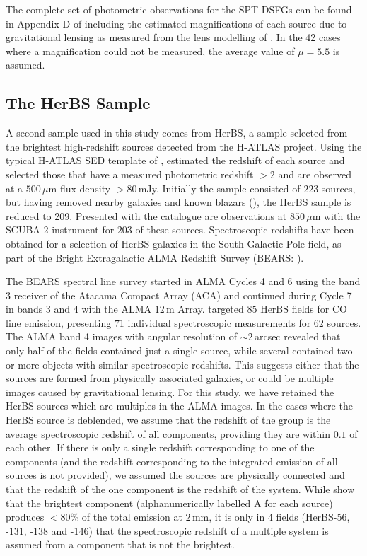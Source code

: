 The complete set of photometric observations for the SPT DSFGs can be found in Appendix D of \citealt{Reuter_2020} including the estimated magnifications of each source due to gravitational lensing as measured from the lens modelling of \citealt{Spilker_2016}. In the 42 cases where a magnification could not be measured, the average value of $\mu = 5.5$ is assumed.

\subsection{The HerBS Sample}

A second sample used in this study comes from HerBS, a sample selected from the brightest high-redshift sources detected from the H-ATLAS project. Using the typical H-ATLAS SED template of \citealt{Pearson_2013}, \citealt{Bakx_2018} estimated the redshift of each source and selected those that have a measured photometric redshift $> 2$ and are observed at a $500\,\mu$m flux density $> 80\,$mJy. Initially the sample consisted of $223$ sources, but having removed nearby galaxies and known blazars (\citealt{Negrello_2010, Lopez-Caniego_2013}), the HerBS sample is reduced to 209. Presented with the catalogue are observations at $850\,\mu$m with the SCUBA-2 instrument for $203$ of these sources. Spectroscopic redshifts have been obtained for a selection of HerBS galaxies in the South Galactic Pole field, as part of the Bright Extragalactic ALMA Redshift Survey (BEARS: \citealt{Urquhart_2022, Bendo_2023, Hagimoto_2023}).

The BEARS spectral line survey started in ALMA Cycles 4 and 6 using the band 3 receiver of the Atacama Compact Array (ACA) and continued during Cycle 7 in bands 3 and 4 with the ALMA $12\,$m Array. \citealt{Urquhart_2022} targeted $85$ HerBS fields for CO line emission, presenting $71$ individual spectroscopic measurements for $62$ sources. The ALMA band 4 images with angular resolution of $\sim 2\,$arcsec revealed that only half of the fields contained just a single source, while several contained two or more objects with similar spectroscopic redshifts. This suggests either that the sources are formed from physically associated galaxies, or could be multiple images caused by gravitational lensing. For this study, we have retained the HerBS sources which are multiples in the ALMA images. In the cases where the HerBS source is deblended, we assume that the redshift of the group is the average spectroscopic redshift of all components, providing they are within $0.1$ of each other. If there is only a single redshift corresponding to one of the components (and the redshift corresponding to the integrated emission of all sources is not provided), we assumed the sources are physically connected and that the redshift of the one component is the redshift of the system. While \citealt{Bendo_2023} show that the brightest component (alphanumerically labelled A for each source) produces $< 80\%$ of the total emission at $2\,$mm, it is only in 4 fields (HerBS-56, -131, -138 and -146) that the spectroscopic redshift of a multiple system is assumed from a component that is not the brightest.

